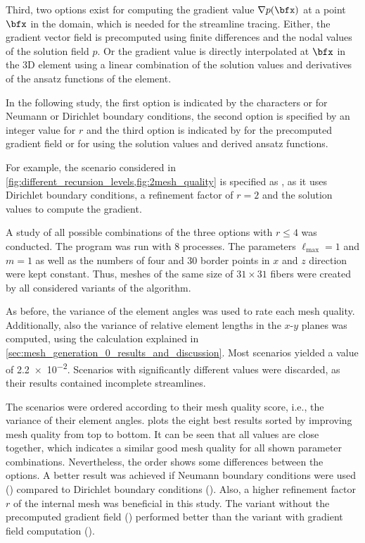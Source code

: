 Third, two options exist for computing the gradient value $\nabla p(\bfx)$ at a point $\bfx$ in the domain, which is needed for the streamline tracing.
Either, the gradient vector field is precomputed using finite differences and the nodal values of the solution field $p$.
Or the gradient value is directly interpolated at $\bfx$ in the 3D element using a linear combination of the solution values and derivatives of the ansatz functions of the element.

In the following study, the first option is indicated by the characters  or  for Neumann or Dirichlet boundary conditions, the second option is specified by an integer value for $r$ and the third option is indicated by  for the precomputed gradient field or  for using the solution values and derived ansatz functions.

For example, the scenario considered in \cref{fig:different_recursion_levels,fig:2mesh_quality} is specified as , as it uses Dirichlet boundary conditions, a refinement factor of $r=2$  and the solution values to compute the gradient.

A study of all possible combinations of the three options with $r \leq 4$ was conducted.  The program was run with 8 processes. The parameters $\ell_\text{max}=1$ and $m=1$ as well as the numbers of four and 30 border points in $x$ and $z$ direction were kept constant. Thus, meshes of the same size of $31\times 31$ fibers were created by all considered variants of the algorithm.

As before, the variance of the element angles was used to rate each mesh quality. Additionally, also the variance of relative element lengths in the $x$-$y$ planes was computed, using the calculation explained in \cref{sec:mesh_generation_0_results_and_discussion}. Most scenarios yielded a value of \num{2.2e-2}. Scenarios with significantly different values were discarded, as their results contained incomplete streamlines.

The scenarios were ordered according to their mesh quality score, i.e., the variance of their element angles.  plots the eight best results sorted by improving mesh quality from top to bottom.
It can be seen that all values are close together, which indicates a similar good mesh quality for all shown parameter combinations.
Nevertheless, the order shows some differences between the options. A better result was achieved if Neumann boundary conditions were used () compared to Dirichlet boundary conditions (). Also, a higher refinement factor $r$ of the internal mesh was beneficial in this study. The variant without the precomputed gradient field () performed better than the variant with gradient field computation ().

